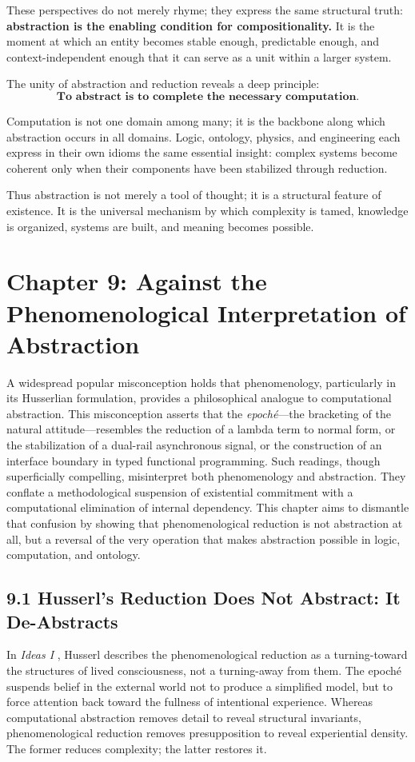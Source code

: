 \documentclass[12pt,letterpaper]{article}
\begin{document}
These perspectives do not merely rhyme; they express the same structural truth: \textbf{abstraction is the enabling condition for compositionality.} It is the moment at which an entity becomes stable enough, predictable enough, and context-independent enough that it can serve as a unit within a larger system.

The unity of abstraction and reduction reveals a deep principle:
\[
\textbf{To abstract is to complete the necessary computation.}
\]

Computation is not one domain among many; it is the backbone along which abstraction occurs in all domains. Logic, ontology, physics, and engineering each express in their own idioms the same essential insight: complex systems become coherent only when their components have been stabilized through reduction.

Thus abstraction is not merely a tool of thought; it is a structural feature of existence. It is the universal mechanism by which complexity is tamed, knowledge is organized, systems are built, and meaning becomes possible.

\newpage

\section{Chapter 9: Against the Phenomenological Interpretation of Abstraction}

A widespread popular misconception holds that phenomenology, particularly in its Husserlian formulation, provides a philosophical analogue to computational abstraction. This misconception asserts that the \emph{epoché}—the bracketing of the natural attitude—resembles the reduction of a lambda term to normal form, or the stabilization of a dual-rail asynchronous signal, or the construction of an interface boundary in typed functional programming. Such readings, though superficially compelling, misinterpret both phenomenology and abstraction. They conflate a methodological suspension of existential commitment with a computational elimination of internal dependency. This chapter aims to dismantle that confusion by showing that phenomenological reduction is not abstraction at all, but a reversal of the very operation that makes abstraction possible in logic, computation, and ontology.

\subsection{9.1 Husserl’s Reduction Does Not Abstract: It De-Abstracts}
In \textit{Ideas I} \parencite{Husserl1913}, Husserl describes the phenomenological reduction as a turning-toward the structures of lived consciousness, not a turning-away from them. The epoché suspends belief in the external world not to produce a simplified model, but to force attention back toward the fullness of intentional experience. Whereas computational abstraction removes detail to reveal structural invariants, phenomenological reduction removes presupposition to reveal experiential density. The former reduces complexity; the latter restores it.
\end{document}

